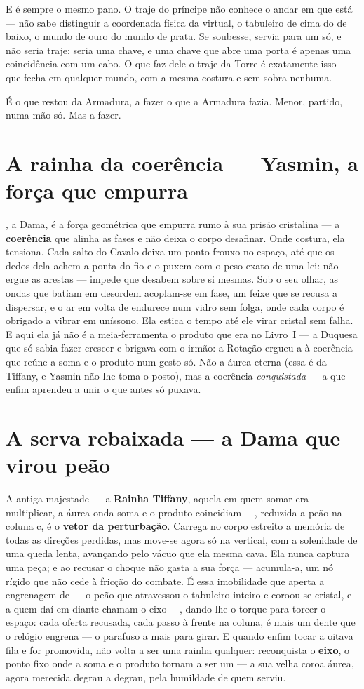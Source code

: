 \documentclass[livro.tex]{subfiles}
\begin{document}
\medskip

E é sempre o mesmo pano. O traje do príncipe não conhece o andar em que está --- não sabe
distinguir a coordenada física da virtual, o tabuleiro de cima do de baixo, o mundo de
ouro do mundo de prata. Se soubesse, servia para um só, e não seria traje: seria uma
chave, e uma chave que abre uma porta é apenas uma coincidência com um cabo. O que faz
dele o traje da Torre é exatamente isso --- que fecha em qualquer mundo, com a mesma
costura e sem sobra nenhuma.

É o que restou da Armadura, a fazer o que a Armadura fazia. Menor, partido, numa mão só.
Mas a fazer.

\chapter{A rainha da coerência --- Yasmin, a força que empurra}
\Yas , a Dama, é a força geométrica que empurra \Ven rumo à sua prisão
cristalina --- a \textbf{coerência} que alinha as fases e não deixa o corpo
desafinar. Onde \Joa costura, ela tensiona. Cada salto do Cavalo deixa um ponto frouxo
no espaço, até que os dedos dela achem a ponta do fio e o puxem com o peso exato de uma
lei: não ergue as arestas --- impede que desabem sobre si mesmas. Sob o seu olhar, as
ondas que batiam em desordem acoplam-se em fase, um feixe que se recusa a dispersar, e o
ar em volta de \Ven endurece num vidro sem folga, onde cada corpo é obrigado a vibrar em
uníssono. Ela estica o tempo até ele virar cristal sem falha. E aqui ela já não é a
meia-ferramenta o produto que era no Livro~I --- a Duquesa que só sabia fazer crescer e brigava com o
irmão: a Rotação ergueu-a à coerência que reúne a soma e o produto num gesto só. Não
a áurea eterna (essa é da Tiffany, e Yasmin não lhe toma o posto), mas a coerência
\emph{conquistada} --- a que enfim aprendeu a unir o que antes só puxava.

\chapter{A serva rebaixada --- a Dama que virou peão}
A antiga majestade --- a \textbf{Rainha Tiffany}, aquela em quem somar era
multiplicar, a áurea onda soma e o produto coincidiam ---, reduzida a peão na coluna
\textsf{c}, é o \textbf{vetor da perturbação}. Carrega no corpo estreito a memória de todas as
direções perdidas, mas move-se agora só na vertical, com a solenidade de uma queda
lenta, avançando pelo vácuo que ela mesma cava. Ela nunca captura uma peça; e ao recusar
o choque não gasta a sua força --- acumula-a, um nó rígido que não cede à fricção do
combate. É essa imobilidade que aperta a engrenagem de \Lck --- o peão que atravessou o
tabuleiro inteiro e coroou-se cristal, e a quem daí em diante chamam o eixo ---,
dando-lhe o torque para
torcer o espaço: cada oferta recusada, cada passo à frente na coluna, é mais um dente
que o relógio engrena --- o parafuso a mais para girar. E quando enfim tocar a oitava
fila e for promovida, não volta a ser uma rainha
qualquer: reconquista o \textbf{eixo}, o ponto fixo onde a soma e o produto
tornam a ser um --- a sua velha coroa áurea, agora merecida degrau a degrau, pela
humildade de quem serviu.
\end{document}
